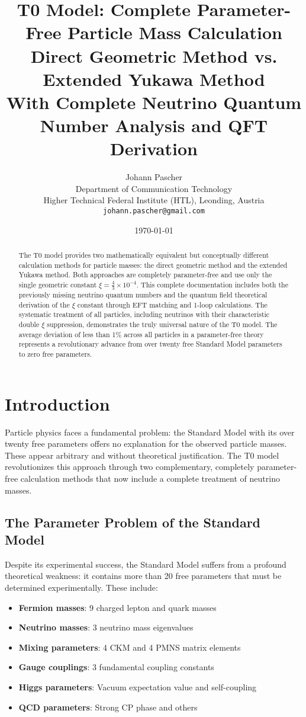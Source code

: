 \documentclass[12pt,a4paper]{article}
\title{T0 Model: Complete Parameter-Free Particle Mass Calculation \\
	\large Direct Geometric Method vs. Extended Yukawa Method \\
	\large With Complete Neutrino Quantum Number Analysis and QFT Derivation}
\author{Johann Pascher\\
	Department of Communication Technology\\
	Higher Technical Federal Institute (HTL), Leonding, Austria\\
	\texttt{johann.pascher@gmail.com}}
\date{\today}
\newcommand{\xipar}{\xi}
\begin{document}
	\maketitle
	
	\begin{abstract}
		The T0 model provides two mathematically equivalent but conceptually different calculation methods for particle masses: the direct geometric method and the extended Yukawa method. Both approaches are completely parameter-free and use only the single geometric constant $\xipar = \frac{4}{3} \times 10^{-4}$. This complete documentation includes both the previously missing neutrino quantum numbers and the quantum field theoretical derivation of the $\xi$ constant through EFT matching and 1-loop calculations. The systematic treatment of all particles, including neutrinos with their characteristic double $\xi$ suppression, demonstrates the truly universal nature of the T0 model. The average deviation of less than 1\% across all particles in a parameter-free theory represents a revolutionary advance from over twenty free Standard Model parameters to zero free parameters.
	\end{abstract}
	
	\tableofcontents
	\newpage
	
	\section{Introduction}
	\label{sec:introduction}
	
	Particle physics faces a fundamental problem: the Standard Model with its over twenty free parameters offers no explanation for the observed particle masses. These appear arbitrary and without theoretical justification. The T0 model revolutionizes this approach through two complementary, completely parameter-free calculation methods that now include a complete treatment of neutrino masses.
	
	\subsection{The Parameter Problem of the Standard Model}
	\label{subsec:parameter_problem}
	
	Despite its experimental success, the Standard Model suffers from a profound theoretical weakness: it contains more than 20 free parameters that must be determined experimentally. These include:
	
	\begin{itemize}
		\item \textbf{Fermion masses}: 9 charged lepton and quark masses
		\item \textbf{Neutrino masses}: 3 neutrino mass eigenvalues
		\item \textbf{Mixing parameters}: 4 CKM and 4 PMNS matrix elements
		\item \textbf{Gauge couplings}: 3 fundamental coupling constants
		\item \textbf{Higgs parameters}: Vacuum expectation value and self-coupling
		\item \textbf{QCD parameters}: Strong CP phase and others
	\end{itemize}
	
\end{document}
